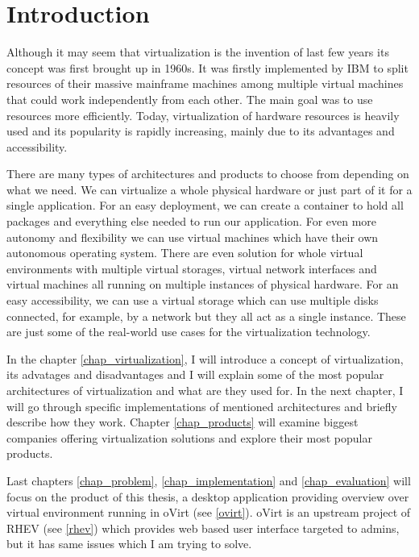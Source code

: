 
\chapter{Introduction}
Although it may seem that virtualization is the invention of last few years its concept was first brought up in 1960s. It was firstly implemented by IBM to split resources of their massive mainframe machines among multiple virtual machines that could work independently from each other. The main goal was to use resources more efficiently. Today, virtualization of hardware resources is heavily used and its popularity is rapidly increasing, mainly due to its advantages and accessibility.

There are many types of architectures and products to choose from depending on what we need. We can virtualize a whole physical hardware or just part of it for a single application. For an easy deployment, we can create a container to hold all packages and everything else needed to run our application. For even more autonomy and flexibility we can use virtual machines which have their own autonomous operating system. There are even solution for whole virtual environments with multiple virtual storages, virtual network interfaces and virtual machines all running on multiple instances of physical hardware. For an easy accessibility, we can use a virtual storage which can use multiple disks connected, for example, by a network but they all act as a single instance. These are just some of the real-world use cases for the virtualization technology.

In the chapter \ref{chap_virtualization}, I will introduce a concept of virtualization, its advatages and disadvantages and I will explain some of the most popular architectures of virtualization and what are they used for. In the next chapter, I will go through specific implementations of mentioned architectures and briefly describe how they work. Chapter \ref{chap_products} will examine biggest companies offering virtualization solutions and explore their most popular products.

Last chapters \ref{chap_problem}, \ref{chap_implementation} and \ref{chap_evaluation} will focus on the product of this thesis, a desktop application providing overview over virtual environment running in oVirt (see \ref{ovirt}). oVirt is an upstream project of RHEV (see \ref{rhev}) which provides web based user interface targeted to admins, but it has same issues which I am trying to solve.

